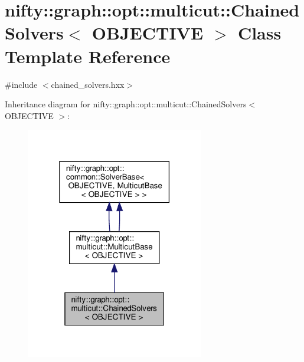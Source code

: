 \hypertarget{classnifty_1_1graph_1_1opt_1_1multicut_1_1ChainedSolvers}{}\section{nifty\+:\+:graph\+:\+:opt\+:\+:multicut\+:\+:Chained\+Solvers$<$ O\+B\+J\+E\+C\+T\+I\+VE $>$ Class Template Reference}
\label{classnifty_1_1graph_1_1opt_1_1multicut_1_1ChainedSolvers}


{\ttfamily \#include $<$chained\+\_\+solvers.\+hxx$>$}



Inheritance diagram for nifty\+:\+:graph\+:\+:opt\+:\+:multicut\+:\+:Chained\+Solvers$<$ O\+B\+J\+E\+C\+T\+I\+VE $>$\+:
\nopagebreak
\begin{figure}[H]
\begin{center}
\leavevmode
\includegraphics[width=219pt]{classnifty_1_1graph_1_1opt_1_1multicut_1_1ChainedSolvers__inherit__graph}
\end{center}
\end{figure}


